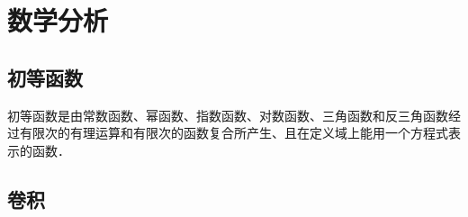 \chapter{数学分析}

\section{初等函数}

\begin{Definition}
    初等函数是由常数函数、幂函数、指数函数、对数函数、三角函数和反三角函数经过有限次的有理运算和有限次的函数复合所产生、且在定义域上能用一个方程式表示的函数．
\end{Definition}


\section{卷积}
